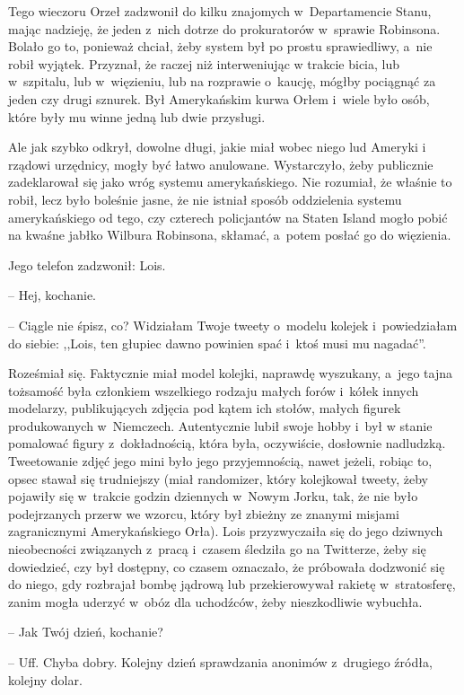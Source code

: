 \documentclass[oneside,polish,11pt,sfheadings]{mwbk}
\begin{document}
Tego wieczoru Orzeł zadzwonił do kilku znajomych w~Departamencie Stanu,
mając nadzieję, że jeden z~nich dotrze do prokuratorów w~sprawie
Robinsona. Bolało go to, ponieważ chciał, żeby system był po prostu
sprawiedliwy, a~nie robił wyjątek. Przyznał, że raczej niż interweniując
w trakcie bicia, lub w~szpitalu, lub w~więzieniu, lub na rozprawie o~kaucję, mógłby pociągnąć za jeden czy drugi sznurek. Był Amerykańskim
kurwa Orłem i~wiele było osób, które były mu winne jedną lub dwie
przysługi.

Ale jak szybko odkrył, dowolne długi, jakie miał wobec niego lud Ameryki
i rządowi urzędnicy, mogły być łatwo anulowane. Wystarczyło, żeby
publicznie zadeklarował się jako wróg systemu amerykańskiego. Nie
rozumiał, że właśnie to robił, lecz było boleśnie jasne, że nie istniał
sposób oddzielenia systemu amerykańskiego od tego, czy czterech
policjantów na Staten Island mogło pobić na kwaśne jabłko Wilbura
Robinsona, skłamać, a~potem posłać go do więzienia.

Jego telefon zadzwonił: Lois.

-- Hej, kochanie.

-- Ciągle nie śpisz, co? Widziałam Twoje tweety o~modelu kolejek i~powiedziałam do siebie: ,,Lois, ten głupiec dawno powinien spać i~ktoś
musi mu nagadać''.

Roześmiał się. Faktycznie miał model kolejki, naprawdę wyszukany, a~jego
tajna tożsamość była członkiem wszelkiego rodzaju małych forów i~kółek
innych modelarzy, publikujących zdjęcia pod kątem ich stołów, małych
figurek produkowanych w~Niemczech. Autentycznie lubił swoje hobby i~był
w stanie pomalować figury z~dokładnością, która była, oczywiście,
dosłownie nadludzką. Tweetowanie zdjęć jego mini było jego
przyjemnością, nawet jeżeli, robiąc to, opsec stawał się trudniejszy
(miał randomizer, który kolejkował tweety, żeby pojawiły się w~trakcie
godzin dziennych w~Nowym Jorku, tak, że nie było podejrzanych przerw we
wzorcu, który był zbieżny ze znanymi misjami zagranicznymi
Amerykańskiego Orła). Lois przyzwyczaiła się do jego dziwnych
nieobecności związanych z~pracą i~czasem śledziła go na Twitterze, żeby
się dowiedzieć, czy był dostępny, co czasem oznaczało, że próbowała
dodzwonić się do niego, gdy rozbrajał bombę jądrową lub przekierowywał
rakietę w~stratosferę, zanim mogła uderzyć w~obóz dla uchodźców, żeby
nieszkodliwie wybuchła.

-- Jak Twój dzień, kochanie?

-- Uff. Chyba dobry. Kolejny dzień sprawdzania anonimów z~drugiego
źródła, kolejny dolar.
\end{document}
